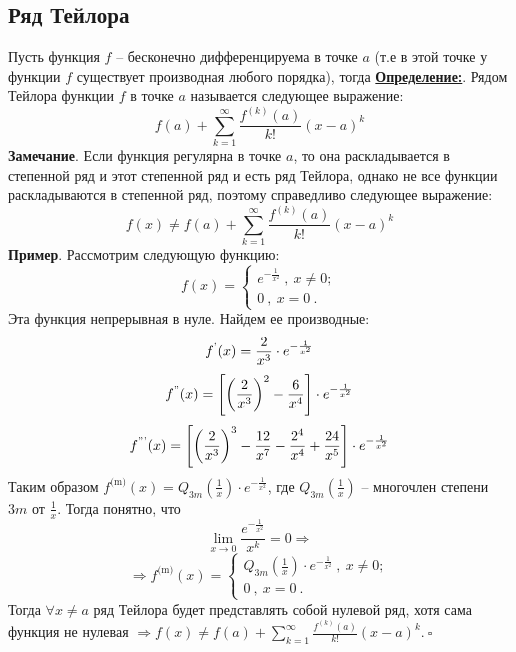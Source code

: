 \documentclass[a4paper,12pt]{article} %
\begin{document}
\subsection{Ряд Тейлора}
Пусть функция $f$ -- бесконечно дифференцируема в точке $a$ (т.е в этой точке у функции $f$ существует производная любого порядка), тогда
\underline{\textbf{Определение:}}. Рядом Тейлора функции $f$ в точке $a$ называется следующее выражение:
\begin{equation*}
f(a) + \sum\limits_{k = 1}^{\infty} \frac{f^{(k)}(a)}{k!}(x-a)^k 
\end{equation*}
\textbf{Замечание}. Если функция регулярна в точке $a$, то она раскладывается в степенной ряд и этот степенной ряд и есть ряд Тейлора, однако не все функции раскладываются в степенной ряд, поэтому справедливо следующее выражение:
\begin{equation*}
f(x) \neq f(a) + \sum\limits_{k = 1}^{\infty} \frac{f^{(k)}(a)}{k!}(x-a)^k 
\end{equation*}
\textbf{Пример}. Рассмотрим следующую функцию:
\begin{equation*}
f(x) = \begin{cases}
	e^{-\frac{1}{x^2}}\ ,\ x \neq 0;\\
	0\ ,\ x = 0\ .
\end{cases}
\end{equation*}
Эта функция непрерывная в нуле. Найдем ее производные:
\begin{equation*}
f^{\text{'}}(x) = \frac{2}{x^3}\cdot e^{-\frac{1}{x^2}}\\
\end{equation*}
\begin{equation*}
f^{\text{''}}(x) = \left[ \left( \frac{2}{x^3}\right)^2 - \frac{6}{x^4} \right]\cdot e^{-\frac{1}{x^2}}\\
\end{equation*}
\begin{equation*}
f^{\text{'''}}(x) = \left[ \left( \frac{2}{x^3}\right)^3 - \frac{12}{x^7} - \frac{2^4}{x^4} + \frac{24}{x^5} \right]\cdot e^{-\frac{1}{x^2}}\\
\end{equation*}
Таким образом $f^{\text{(m)}}(x) = Q_{3m}(\frac{1}{x})\cdot e^{-\frac{1}{x^2}}$, где $Q_{3m}(\frac{1}{x})$ -- многочлен степени $3m$ от $\frac{1}{x}$. Тогда понятно, что 
\begin{equation*}
\lim\limits_{x\to 0} \frac{e^{-\frac{1}{x^2}}}{x^k} = 0 \Rightarrow 
\end{equation*}
\begin{equation*}
\Rightarrow f^{\text{(m)}}(x) = \begin{cases}
	Q_{3m}(\frac{1}{x}) \cdot e^{-\frac{1}{x^2}}\ ,\ x \neq 0;\\
	0\ ,\ x = 0\ .
\end{cases}
\end{equation*}
Тогда $\forall x \neq a$ ряд Тейлора будет представлять собой нулевой ряд, хотя сама функция не нулевая $\Rightarrow f(x) \neq f(a) + \sum\limits_{k = 1}^{\infty} \frac{f^{(k)}(a)}{k!}(x-a)^k.\ \square$ 
\end{document}
